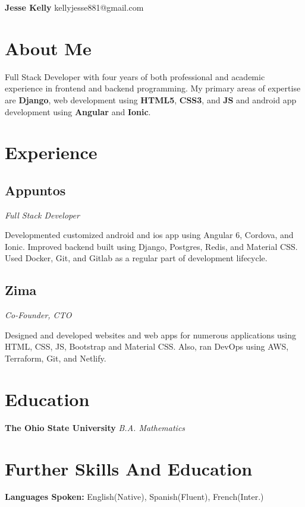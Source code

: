 \documentclass[letterpaper,11pt]{article}
\begin{document}
\begin{flushleft}
\Large{\textbf{Jesse Kelly}}
\newline
kellyjesse881@gmail.com
\end{flushleft}

\section{About Me}
Full Stack Developer with four years of both
professional and academic experience in frontend
and backend programming. My primary areas of
expertise are \textbf{Django}, web development using \textbf{HTML5},
\textbf{CSS3}, and \textbf{JS} and android app development using
\textbf{Angular} and \textbf{Ionic}.

\section{Experience}
\subsection{Appuntos}
\textit{Full Stack Developer}
\vspace{2mm}
\begin{adjustwidth}{1cm}{1cm}
Developmented customized android and ios
app using Angular 6, Cordova, and Ionic.
Improved backend built using Django,
Postgres, Redis, and Material CSS. Used
Docker, Git, and Gitlab as a regular part
of development lifecycle.
\end{adjustwidth}

\subsection{Zima}
\textit{Co-Founder, CTO}
\vspace{2mm}
\begin{adjustwidth}{1cm}{1cm}
Designed and developed websites and web
apps for numerous applications using
HTML, CSS, JS, Bootstrap and Material CSS.
Also, ran DevOps using AWS, Terraform,
Git, and Netlify.
\end{adjustwidth}
\section{Education}
\textbf{The Ohio State University}
\newline
\textit{B.A. Mathematics}

\section{Further Skills And Education}
\textbf{Languages Spoken: } English(Native), Spanish(Fluent), French(Inter.)
\end{document}
